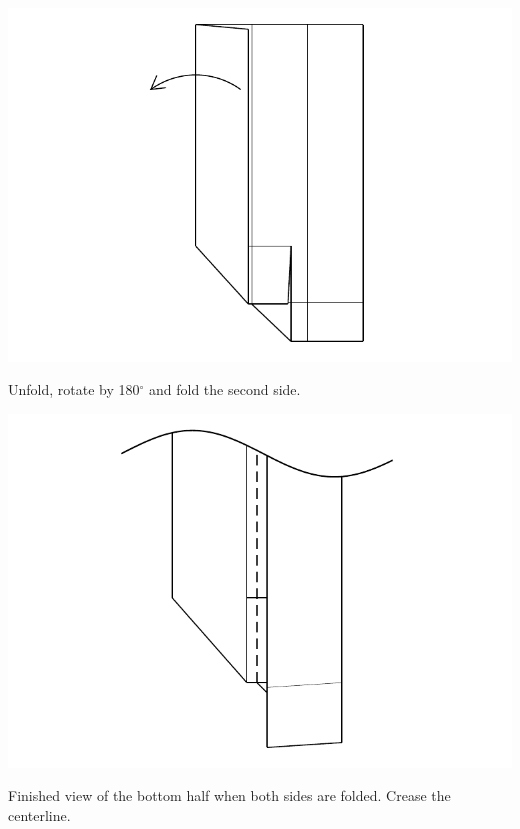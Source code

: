 \documentclass[11pt]{article}
\begin{document}
\begin{minipage}[t]{0.3\textwidth}
  \includegraphics[width=\textwidth]{../figs/fig04-07}
  \begin{itemize}{\item[7.] Unfold, rotate by 180$^\circ$ and fold the second side.}\end{itemize}
\end{minipage}
\begin{minipage}[t]{0.3\textwidth}
  \includegraphics[width=\textwidth]{../figs/fig04-08}
  \begin{itemize}{\item[8.] Finished view of the bottom half when both sides are folded.  Crease the centerline.}\end{itemize}
\end{minipage}
\end{document}
